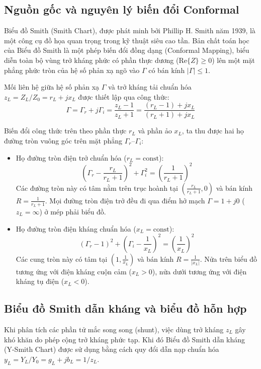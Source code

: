 \documentclass[a4paper]{report}
\newcommand\Zo{Z_0}
\newcommand\ZL{Z_L}
\begin{document}
\subsection{Nguồn gốc và nguyên lý biến đổi Conformal}
Biểu đồ Smith (Smith Chart), được phát minh bởi Phillip H. Smith năm 1939, là một công cụ đồ họa quan trọng trong kỹ thuật siêu cao tần. Bản chất toán học của Biểu đồ Smith là một phép biến đổi đồng dạng (Conformal Mapping), biểu diễn toàn bộ vùng trở kháng phức có phần thực dương ($\mathrm{Re}\{Z\}\ge 0$) lên một mặt phẳng phức tròn của hệ số phản xạ ngõ vào $\Gamma$ có bán kính $|\Gamma|\le 1$.

Mối liên hệ giữa hệ số phản xạ $\Gamma$ và trở kháng tải chuẩn hóa $z_L=\ZL/\Zo=r_L+jx_L$ được thiết lập qua công thức:
\begin{equation}
  \Gamma = \Gamma_r + j\Gamma_i = \frac{z_L-1}{z_L+1} = \frac{(r_L-1)+jx_L}{(r_L+1)+jx_L}
\end{equation}

Biến đổi công thức trên theo phần thực $r_L$ và phần ảo $x_L$, ta thu được hai họ đường tròn vuông góc trên mặt phẳng $\Gamma_r$–$\Gamma_i$:
\begin{itemize}
  \item Họ đường tròn điện trở chuẩn hóa ($r_L=\text{const}$):
  \begin{equation}
    \left(\Gamma_r-\frac{r_L}{r_L+1}\right)^2+\Gamma_i^2=\left(\frac{1}{r_L+1}\right)^2
  \end{equation}
  Các đường tròn này có tâm nằm trên trục hoành tại $\left(\frac{r_L}{r_L+1},0\right)$ và bán kính $R=\frac{1}{r_L+1}$. Mọi đường tròn điện trở đều đi qua điểm hở mạch $\Gamma=1+j0$ ($z_L=\infty$) ở mép phải biểu đồ.
  \item Họ đường tròn điện kháng chuẩn hóa ($x_L=\text{const}$):
  \begin{equation}
    (\Gamma_r-1)^2+\left(\Gamma_i-\frac{1}{x_L}\right)^2=\left(\frac{1}{x_L}\right)^2
  \end{equation}
  Các cung tròn này có tâm tại $\left(1,\frac{1}{x_L}\right)$ và bán kính $R=\frac{1}{|x_L|}$. Nửa trên biểu đồ tương ứng với điện kháng cuộn cảm ($x_L>0$), nửa dưới tương ứng với điện kháng tụ điện ($x_L<0$).
\end{itemize}

\subsection{Biểu đồ Smith dẫn kháng và biểu đồ hỗn hợp}
Khi phân tích các phần tử mắc song song (shunt), việc dùng trở kháng $z_L$ gây khó khăn do phép cộng trở kháng phức tạp. Khi đó Biểu đồ Smith dẫn kháng (Y-Smith Chart) được sử dụng bằng cách quy đổi dẫn nạp chuẩn hóa $y_L=Y_L/Y_0=g_L+jb_L=1/z_L$.
\end{document}
